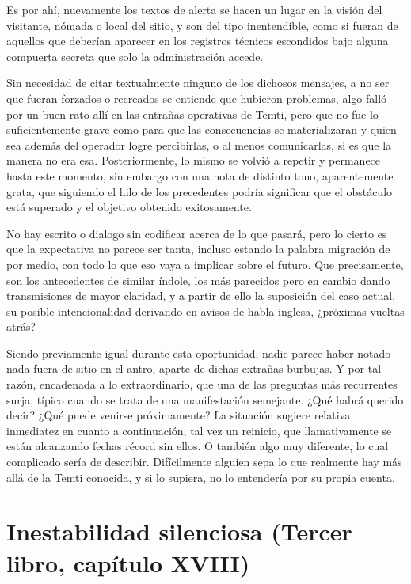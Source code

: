\documentclass[
]{book}
\begin{document}
Es por ahí, nuevamente los textos de alerta se hacen un lugar en la visión del visitante, nómada o local del sitio, y son del tipo inentendible, como si fueran de aquellos que deberían aparecer en los registros técnicos escondidos bajo alguna compuerta secreta que solo la administración accede.

Sin necesidad de citar textualmente ninguno de los dichosos mensajes, a no ser que fueran forzados o recreados se entiende que hubieron problemas, algo falló por un buen rato allí en las entrañas operativas de Temti, pero que no fue lo suficientemente grave como para que las consecuencias se materializaran y quien sea además del operador logre percibirlas, o al menos comunicarlas, si es que la manera no era esa. Posteriormente, lo mismo se volvió a repetir y permanece hasta este momento, sin embargo con una nota de distinto tono, aparentemente grata, que siguiendo el hilo de los precedentes podría significar que el obstáculo está superado y el objetivo obtenido exitosamente.

No hay escrito o dialogo sin codificar acerca de lo que pasará, pero lo cierto es que la expectativa no parece ser tanta, incluso estando la palabra migración de por medio, con todo lo que eso vaya a implicar sobre el futuro. Que precisamente, son los antecedentes de similar índole, los más parecidos pero en cambio dando transmisiones de mayor claridad, y a partir de ello la suposición del caso actual, su posible intencionalidad derivando en avisos de habla inglesa, ¿próximas vueltas atrás?

Siendo previamente igual durante esta oportunidad, nadie parece haber notado nada fuera de sitio en el antro, aparte de dichas extrañas burbujas. Y por tal razón, encadenada a lo extraordinario, que una de las preguntas más recurrentes surja, típico cuando se trata de una manifestación semejante. ¿Qué habrá querido decir? ¿Qué puede venirse próximamente? La situación sugiere relativa inmediatez en cuanto a continuación, tal vez un reinicio, que llamativamente se están alcanzando fechas récord sin ellos. O también algo muy diferente, lo cual complicado sería de describir. Difícilmente alguien sepa lo que realmente hay más allá de la Temti conocida, y si lo supiera, no lo entendería por su propia cuenta.

\hypertarget{inestabilidad-silenciosa-tercer-libro-capuxedtulo-xviii}{%
\section{Inestabilidad silenciosa (Tercer libro, capítulo XVIII)}\label{inestabilidad-silenciosa-tercer-libro-capuxedtulo-xviii}}
\end{document}
